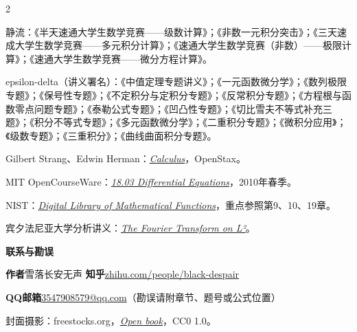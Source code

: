 {\begin{multicols}{2}
\begin{enumerate}[label=\textcolor{Teal}{[\arabic*]},leftmargin=2.2em,itemsep=2pt,topsep=1pt,parsep=0pt]
\item 静流：《半天速通大学生数学竞赛——级数计算》；《非数一元积分突击》；《三天速成大学生数学竞赛——多元积分计算》；《速通大学生数学竞赛（非数）——极限计算》；《速通大学生数学竞赛——微分方程计算》。
\item epsilon-delta（讲义署名）：《中值定理专题讲义》；《一元函数微分学》；《数列极限专题》；《保号性专题》；《不定积分与定积分专题》；《反常积分专题》；《方程根与函数零点问题专题》；《泰勒公式专题》；《凹凸性专题》；《切比雪夫不等式补充三题》；《积分不等式专题》；《多元函数微分学》；《二重积分专题》；《微积分应用》；《级数专题》；《三重积分》；《曲线曲面积分专题》。
\item Gilbert Strang、Edwin Herman：\href{https://openstax.org/books/calculus-volume-1/pages/preface}{\textit{Calculus}}，OpenStax。
\item MIT OpenCourseWare：\href{https://ocw.mit.edu/courses/18-03-differential-equations-spring-2010/}{\textit{18.03 Differential Equations}}，2010年春季。
\item NIST：\href{https://dlmf.nist.gov/}{\textit{Digital Library of Mathematical Functions}}，重点参照第9、10、19章。
\item 宾夕法尼亚大学分析讲义：\href{https://www2.math.upenn.edu/~gressman/analysis/14-plancherel.html}{\textit{The Fourier Transform on L²}}。
\end{enumerate}
\end{multicols}}

\smallskip
\noindent\textbf{\large\color{Teal}联系与勘误}

\begin{tcolorbox}[colback=Teal!3,colframe=Teal!35,boxrule=.4pt,before skip=5pt,after skip=4pt]
\small
\textbf{作者}\quad 雪落长安无声\hfill
\textbf{知乎}\quad \href{https://www.zhihu.com/people/black-despair}{zhihu.com/people/black-despair}\par\smallskip
\textbf{QQ邮箱}\quad \href{mailto:3547908579@qq.com}{3547908579@qq.com}\quad （勘误请附章节、题号或公式位置）
\end{tcolorbox}

\vfill
{\footnotesize\color{black!60}封面摄影：freestocks.org，\href{https://commons.wikimedia.org/wiki/File:Open_book_(26421751605).jpg}{\textit{Open book}}，CC0 1.0。\par}
